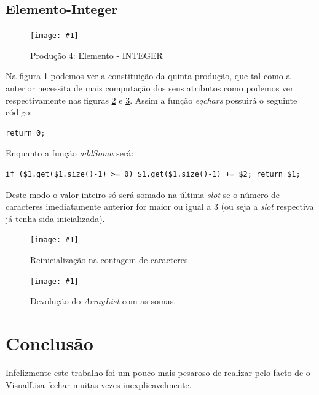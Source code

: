 \documentclass[a4paper,11pt,openright,openbib]{article}
\newcommand{\addimg}[3]{\begin{figure}[h!]
	\begin{center}
		\texttt{[image: \#1]}
	\end{center}	
	\caption{\label{#2}#3}
\end{figure}
}
\begin{document}
\subsection{Elemento-Integer}
\addimg{../imgs/elemento-INTEGER.png}{elemento_integer}{Produção 4: Elemento - INTEGER}
Na figura \ref{elemento_integer} podemos ver a constituição da quinta produção, que  tal como a anterior necessita de 
mais computação dos seus atributos como podemos ver respectivamente nas figuras \ref{fn1_elemento_INTEGER} e 
\ref{fn2_elemento_INTEGER}. 
Assim a função \emph{eqchars} possuirá o seguinte código:
\begin{verbatim}return 0;\end{verbatim}
Enquanto a função \emph{addSoma} será:
\begin{verbatim}if ($1.get($1.size()-1) >= 0) $1.get($1.size()-1) += $2; return $1;\end{verbatim} %
Deste modo o valor inteiro só será somado na última \emph{slot} se o número de caracteres imediatamente anterior for
maior ou igual a 3 (ou seja a \emph{slot} respectiva já tenha sida inicializada).
\addimg{../imgs/fn1_elemento-INTEGER.png}{fn1_elemento_INTEGER}{Reinicialização na contagem de caracteres.}
\addimg{../imgs/fn2_elemento-INTEGER.png}{fn2_elemento_INTEGER}{Devolução do \emph{ArrayList} com as somas.}

\section{Conclusão}
Infelizmente este trabalho foi um pouco mais pesaroso de realizar pelo facto de o VisualLisa fechar muitas vezes inexplicavelmente.
\end{document}
